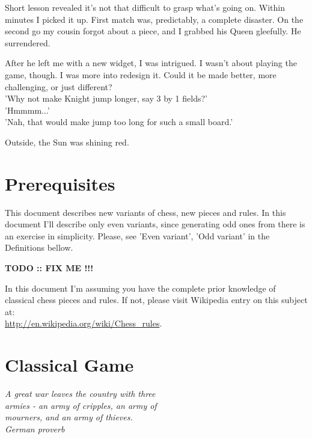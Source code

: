 \documentclass[a5paper,12pt,draft]{book}
\begin{document}
Short lesson revealed it's not that difficult to grasp what's going
on. Within minutes I picked it up. First match was, predictably, a
complete disaster. On the second go my cousin forgot about a piece,
and I grabbed his Queen gleefully. He surrendered.

After he left me with a new widget, I was intrigued. I wasn't
about playing the game, though. I was more into redesign it. Could it
be made better, more challenging, or just different? \\
'Why not make Knight jump longer, say 3 by 1 fields?' \\
'Hmmmm...' \\
'Nah, that would make jump too long for such a small board.'

Outside, the Sun was shining red.
\clearpage

\chapter*{Prerequisites}

\hspace{1.5em} This document describes new variants of chess, new pieces
and rules. In this document I'll describe only even variants, since
generating odd ones from there is an exercise in simplicity. Please,
see 'Even variant', 'Odd variant' in the Definitions bellow.

\textbf{\huge{TODO :: FIX ME !!!}} %

In this document I'm assuming you have the complete prior
knowledge of classical chess pieces and rules. If not, please visit
Wikipedia entry on this subject at: \\
\href{http://en.wikipedia.org/wiki/Chess\_rules}{http://en.wikipedia.org/wiki/Chess\_rules}.
\clearpage

\chapter*{Classical Game}

\begin{flushright}
\emph{
A great war leaves the country with three \\
armies - an army of cripples, an army of \\
mourners, and an army of thieves. \\
\textperiodcentered \textperiodcentered \textperiodcentered \hspace*{0.2em} German proverb}
\end{flushright}
\end{document}
